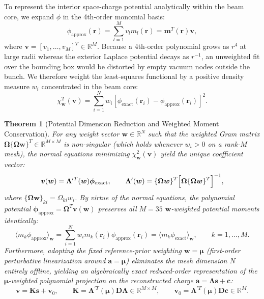 \documentclass[11pt,a4paper]{article}
\newcommand{\bOmega}{\mathbf{\Omega}}
\newcommand{\bLambda}{\mathbf{\Lambda}}
\newtheorem{theorem}{Theorem}
\begin{document}
To represent the interior space-charge potential analytically within the beam core, we expand $\phi$ in the 4th-order monomial basis:
\begin{equation}
    \phi_{\mathrm{approx}}(\bm{r}) = \sum_{l=1}^M v_l m_l(\bm{r}) = \bm{m}^T(\bm{r}) \bm{v},
    \label{eq:phi_approx}
\end{equation}
where $\bm{v} = [v_1, \dots, v_M]^T \in \mathbb{R}^M$. Because a 4th-order polynomial grows as $r^4$ at large radii whereas the exterior Laplace potential decays as $r^{-1}$, an unweighted fit over the bounding box would be distorted by empty vacuum nodes outside the bunch. We therefore weight the least-squares functional by a positive density measure $w_i$ concentrated in the beam core:
\begin{equation}
    \chi^2_{\bm{w}}(\bm{v}) = \sum_{i=1}^N w_i \left[ \phi_{\mathrm{exact}}(\bm{r}_i) - \phi_{\mathrm{approx}}(\bm{r}_i) \right]^2.
    \label{eq:chi2_pot}
\end{equation}

\begin{theorem}[Potential Dimension Reduction and Weighted Moment Conservation]
\label{thm:potential_reduction}
For any weight vector $\bm{w} \in \mathbb{R}^N$ such that the weighted Gram matrix $\bOmega \{\bOmega\bm{w}\}^T \in \mathbb{R}^{M \times M}$ is non-singular (which holds whenever $w_i > 0$ on a rank-$M$ mesh), the normal equations minimizing $\chi^2_{\bm{w}}(\bm{v})$ yield the unique coefficient vector:
\begin{equation}
    \bm{v}(\bm{w}) = \bLambda^{\prime T}(\bm{w}) \bm{\phi}_{\mathrm{exact}}, \qquad \bLambda^{\prime}(\bm{w}) = \{\bOmega\bm{w}\}^T \Bigl[ \bOmega \{\bOmega\bm{w}\}^T \Bigr]^{-1},
    \label{eq:lambda_prime_def}
\end{equation}
where $\{\bOmega\bm{w}\}_{ki} = \Omega_{ki} w_i$. By virtue of the normal equations, the polynomial potential $\bm{\phi}_{\mathrm{approx}} = \bOmega^T \bm{v}(\bm{w})$ preserves all $M=35$ $\bm{w}$-weighted potential moments identically:
\begin{equation}
    \langle m_k \phi_{\mathrm{approx}} \rangle_{\bm{w}} = \sum_{i=1}^N w_i m_k(\bm{r}_i) \phi_{\mathrm{approx}}(\bm{r}_i) = \langle m_k \phi_{\mathrm{exact}} \rangle_{\bm{w}}, \qquad k = 1, \dots, M.
    \label{eq:pot_moment_conservation}
\end{equation}
Furthermore, adopting the fixed reference-prior weighting $\bm{w} = \bm{\mu}$ (first-order perturbative linearization around $\bm{a} = \bm{\mu}$) eliminates the mesh dimension $N$ entirely offline, yielding an algebraically exact reduced-order representation of the $\bm{\mu}$-weighted polynomial projection on the reconstructed charge $\bm{a} = \bLambda\bm{s} + \bm{c}$:
\begin{equation}
    \bm{v} = \bm{K} \bm{s} + \bm{v}_0, \qquad \bm{K} = \bLambda^{\prime T}(\bm{\mu}) \bm{D} \bLambda \in \mathbb{R}^{M \times M}, \qquad \bm{v}_0 = \bLambda^{\prime T}(\bm{\mu}) \bm{D} \bm{c} \in \mathbb{R}^M.
    \label{eq:matrix_magic}
\end{equation}
\end{theorem}
\end{document}
